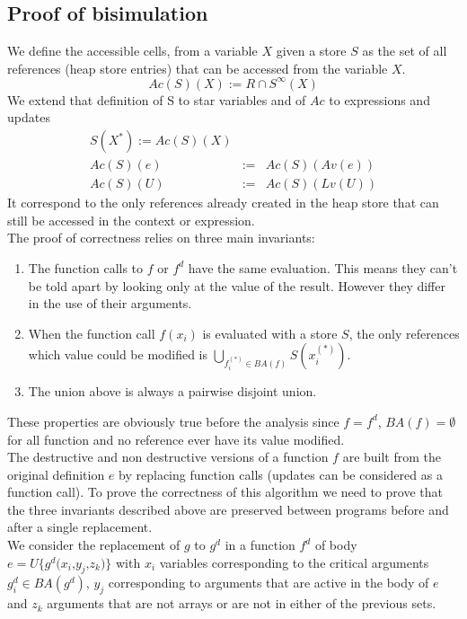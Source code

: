 \documentclass[12pt,a4paper]{article}
\newcommand{\cl}[1]{\texttt{#1}}
\newcommand{\ucont}[1]{\{#1\}}
\begin{document}
\subsection{Proof of bisimulation}

We define the accessible cells, from a variable $X$ given a store $S$ as the set of all references (heap store entries) that can be accessed from the variable $X$.
$$ Ac(S)(X) := R \cap S^{\infty}(X)$$
We extend that definition of S to star variables and of $Ac$ to expressions and updates
\begin{eqnarray*}
S(X^*) := Ac(S)(X) \\
Ac(S)(e) &:=& Ac(S)( Av(e) ) \\
Ac(S)(U) &:=& Ac(S)( Lv(U) )
\end{eqnarray*}
It correspond to the only references already created in the heap store that can still be accessed in the context or expression. \\

The proof of correctness relies on three main invariants:
\begin{enumerate}
\item The function calls to $f$ or $f^d$ have the same evaluation. This means they can't be told apart by looking only at the value of the result. However they differ in the use of their arguments.
\item When the function call $f(x_i)$ is evaluated with a store $S$, the only references which value could be modified is $\bigcup_{f^{(*)}_i \in BA(f)} S\left(x^{(*)}_i\right)$.
\item The union above is always a pairwise disjoint union.
\end{enumerate}
These properties are obviously true before the analysis since $f = f^d$, $BA(f) = \emptyset$ for all function and no reference ever have its value modified.\\

The destructive and non destructive versions of a function $f$ are built from the original definition $e$ by replacing function calls (updates can be considered as a function call). To prove the correctness of this algorithm we need to prove that the three invariants described above are preserved between programs before and after a single replacement. \\

We consider the replacement of $g$ to $g^d$ in a function $f^d$ of body $e =  U\ucont{g^d\cl{(}x_i \cl{,} y_j \cl{,} z_k \cl{)}}$ with $x_i$ variables corresponding to the critical arguments $g^d_i \in BA(g^d)$, $y_j$ corresponding to arguments that are active in the body of $e$ and $z_k$ arguments that are not arrays or are not in either of the previous sets. \\
\end{document}
